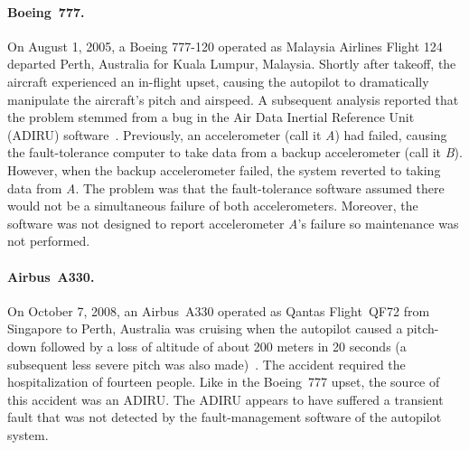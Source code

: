 \paragraph{Boeing~777.}
On August 1, 2005, a Boeing 777-120 operated as Malaysia Airlines Flight 124
departed Perth, Australia for Kuala Lumpur, Malaysia.  Shortly after takeoff,
the aircraft experienced an in-flight upset, causing the autopilot to
dramatically manipulate the aircraft's pitch and airspeed.  A subsequent
analysis reported that the problem stemmed from a bug in the Air Data Inertial
Reference Unit (ADIRU) software~\cite{ATSB07}.  Previously, an accelerometer
(call it \emph{A}) had failed, causing the fault-tolerance computer to take data
from a backup accelerometer (call it \emph{B}).  However, when the backup
accelerometer failed, the system reverted to taking data from \emph{A}.  The
problem was that the fault-tolerance software assumed there would not be a
simultaneous failure of both accelerometers. Moreover, the software
was not designed to report accelerometer \emph{A}'s failure so
maintenance was not performed. 

\paragraph{Airbus~A330.}
On October 7, 2008, an Airbus~A330 operated as Qantas Flight~QF72 from Singapore
to Perth, Australia was cruising when the autopilot caused a pitch-down followed by a
loss of altitude of about 200 meters in 20 seconds (a subsequent less severe pitch was also
made)~\cite{ATSB08}.  The accident required the hospitalization of
fourteen people.  Like in the Boeing~777 upset, the source of this accident was
an ADIRU.  The ADIRU appears to have suffered a transient fault that was not
detected by the fault-management software of the autopilot system.
